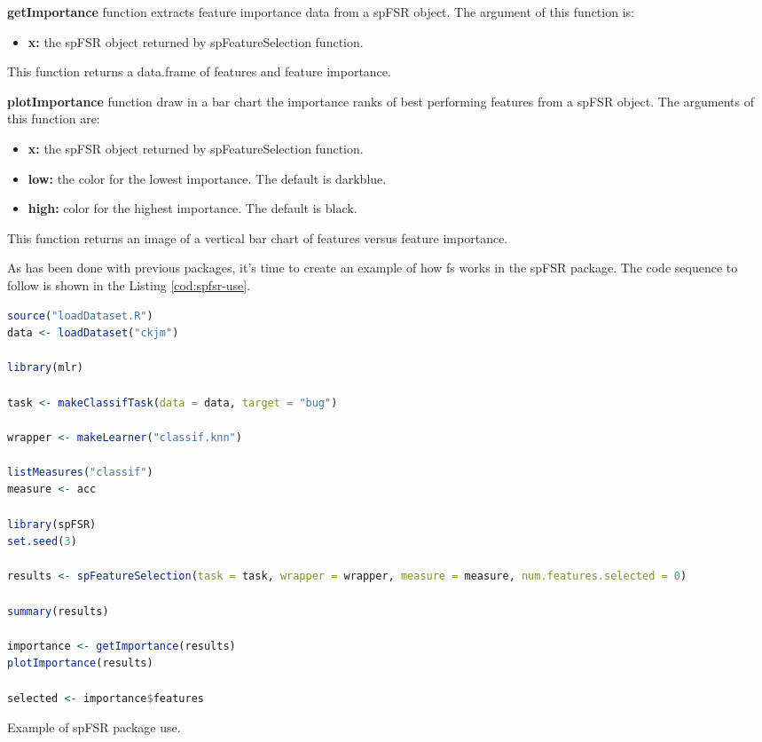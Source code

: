 \textbf{getImportance} function extracts feature importance data from a spFSR object. The argument of this function is:

\begin{itemize}
    \item \textbf{x:} the spFSR object returned by spFeatureSelection function.
\end{itemize}

This function returns a data.frame of features and feature importance.

\textbf{plotImportance} function draw in a bar chart the importance ranks of best performing features from a spFSR object. The arguments of this function are:

\begin{itemize}
    \item \textbf{x:} the spFSR object returned by spFeatureSelection function.
    
    \item \textbf{low:} the color for the lowest importance. The default is darkblue.
    
    \item \textbf{high:} color for the highest importance. The default is black.
\end{itemize}

This function returns an image of a vertical bar chart of features versus feature importance.

As has been done with previous packages, it's time to create an example of how \acrshort{fs} works in the spFSR package. The code sequence to follow is shown in the Listing \ref{cod:spfsr-use}.

\begin{codefloat}[H]
\begin{lstlisting}[language=R, style=Ccolor]
source("loadDataset.R")
data <- loadDataset("ckjm")

library(mlr)

task <- makeClassifTask(data = data, target = "bug")

wrapper <- makeLearner("classif.knn")

listMeasures("classif")
measure <- acc

library(spFSR)
set.seed(3)

results <- spFeatureSelection(task = task, wrapper = wrapper, measure = measure, num.features.selected = 0)

summary(results)

importance <- getImportance(results)
plotImportance(results)

selected <- importance$features
\end{lstlisting}
\caption{Example of spFSR package use.}
\label{cod:spfsr-use}
\end{codefloat}


